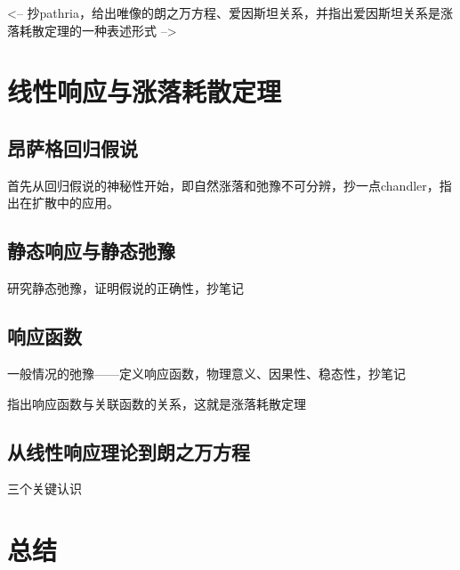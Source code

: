 <-- 抄pathria，给出唯像的朗之万方程、爱因斯坦关系，并指出爱因斯坦关系是涨落耗散定理的一种表述形式 -->

\section{线性响应与涨落耗散定理}\label{sec:线性响应与涨落耗散定理}

\subsection{昂萨格回归假说}\label{subsec:昂萨格回归假说}

首先从回归假说的神秘性开始，即自然涨落和弛豫不可分辨，抄一点chandler，指出在扩散中的应用。

\subsection{静态响应与静态弛豫}\label{subsec:静态响应与静态弛豫}

研究静态弛豫，证明假说的正确性，抄笔记

\subsection{响应函数}\label{subsec:响应函数}

一般情况的弛豫——定义响应函数，物理意义、因果性、稳态性，抄笔记

指出响应函数与关联函数的关系，这就是涨落耗散定理

\subsection{从线性响应理论到朗之万方程}\label{subsec:从线性响应理论到朗之万方程}

三个关键认识

\section{总结}\label{sec:非平衡总结}
